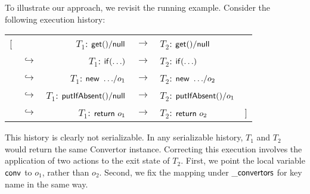 To illustrate our approach, we revisit the running example. Consider the following execution history: %
	\begin{center}
		\begin{tabular}{r@{}lrcl@{}l}
			[ & & $T_1$: ${\sf get()}/{\sf null}$ & $\rightarrow$ & $T_2$: ${\sf get()}/{\sf null}$  & \\
			& $\hookrightarrow$ & $T_1$: ${\sf if(\ldots)}$ & $\rightarrow$  & $T_2$: ${\sf if(\ldots)}$ & \\ 
			& $\hookrightarrow$ & $T_1$: ${\sf new\ \ldots}/o_1$ & $\rightarrow$ & $T_2$: ${\sf new\ \ldots}/o_2$ & \\ 
			& $\hookrightarrow$ & $T_1$: ${\sf putIfAbsent()}/{\sf null}$ & $\rightarrow$ & $T_2$: ${\sf putIfAbsent()}/o_1$  & \\ 
			& $\hookrightarrow$ & $T_1$: ${\sf return}\ o_1$ & $\rightarrow$ & $T_2$: ${\sf return}\ o_2$ & ]
		\end{tabular}
		\end{center}
This history is clearly not serializable. In any serializable history, $T_1$ and $T_2$ would return the same {\sf Convertor} instance. Correcting this execution involves the application of two actions to the exit state of $T_2$. First, we point the local variable ${\sf conv}$ to $o_1$, rather than $o_2$. Second, we fix the mapping under ${\sf \_convertors}$ for key {\sf name} in the same way.

